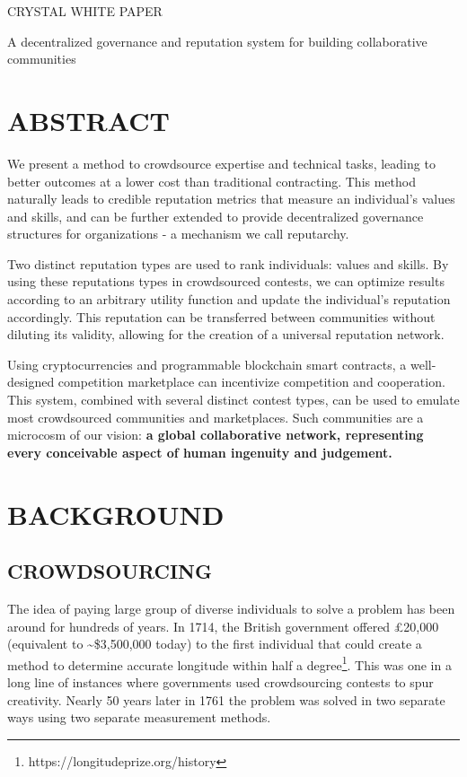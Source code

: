 
CRYSTAL WHITE PAPER

\protect\hypertarget{_aendkubcvh4i}{}{}A decentralized governance and
reputation system for building collaborative communities

\section{\texorpdfstring{\protect\hypertarget{_y1rt8lapt7ck}{}{\protect\hypertarget{_Toc462050395}{}{}}ABSTRACT}{ABSTRACT}}\label{abstract}

We present a method to crowdsource expertise and technical tasks,
leading to better outcomes at a lower cost than traditional contracting.
This method naturally leads to credible reputation metrics that measure
an individual's values and skills, and can be further extended to
provide decentralized governance structures for organizations - a
mechanism we call reputarchy.

Two distinct reputation types are used to rank individuals: values and
skills. By using these reputations types in crowdsourced contests, we
can optimize results according to an arbitrary utility function and
update the individual's reputation accordingly. This reputation can be
transferred between communities without diluting its validity, allowing
for the creation of a universal reputation network.

Using cryptocurrencies and programmable blockchain smart contracts, a
well-designed competition marketplace can incentivize competition and
cooperation. This system, combined with several distinct contest types,
can be used to emulate most crowdsourced communities and marketplaces.
Such communities are a microcosm of our vision: \textbf{a global
collaborative network, representing every conceivable aspect of human
ingenuity and judgement.}

\section{\texorpdfstring{\protect\hypertarget{_dfwalwplhn0i}{}{\protect\hypertarget{_Toc462050396}{}{}}BACKGROUND}{BACKGROUND}}\label{background}

\subsection{CROWDSOURCING}\label{crowdsourcing}

The idea of paying large group of diverse individuals to solve a problem
has been around for hundreds of years. In 1714, the British government
offered £20,000 (equivalent to \textasciitilde{}\$3,500,000 today) to
the first individual that could create a method to determine accurate
longitude within half a degree\footnote{https://longitudeprize.org/history}.
This was one in a long line of instances where governments used
crowdsourcing contests to spur creativity. Nearly 50 years later in 1761
the problem was solved in two separate ways using two separate
measurement methods.

